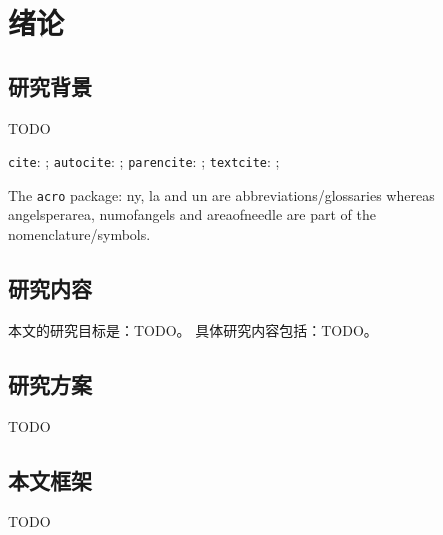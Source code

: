 \chapter{绪论}
\label{chap:introduction}

\section{研究背景}
\label{sec:background}

TODO

\verb|cite|: \cite{li2018halo,li2018cdae};
\verb|autocite|: \autocite{li2018halo};
\verb|parencite|: \parencite{li2018halo};
\verb|textcite|: \textcite{li2018halo};

The \verb|acro| package:
\ac{ny}, \ac{la} and \ac{un} are abbreviations/glossaries
whereas
\ac{angelsperarea}, \ac{numofangels} and \ac{areaofneedle}
are part of the nomenclature/symbols.


\section{研究内容}
\label{sec:content}

本文的研究目标是：TODO。
具体研究内容包括：TODO。


\section{研究方案}
\label{sec:plan}

TODO


\section{本文框架}
\label{sec:structure}

TODO


